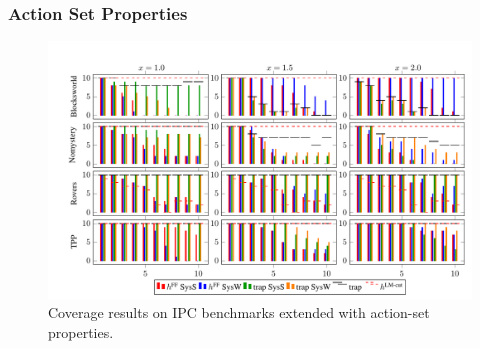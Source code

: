 
\ifdefined\longflagdefined

\subsubsection*{Action Set Properties}

\begin{figure}[htb]
\centering\centering
%
\includegraphics{data/action_set_properties/barchart/barchart.pdf}
\vspace{-0.6cm}
\caption{Coverage results on IPC benchmarks extended with action-set properties.}
\label{fig:barcharts}
\vspace{-0.2cm}
\end{figure}

